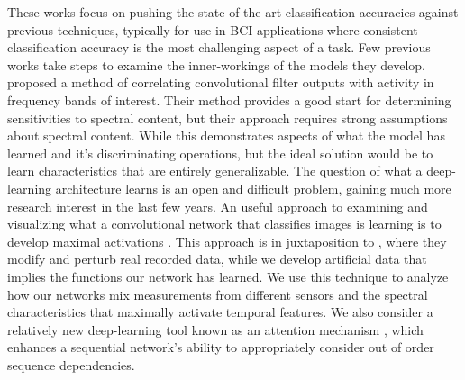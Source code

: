 \documentclass[utf8]{frontiersSCNS} %
\begin{document}
These works focus on pushing the state-of-the-art classification accuracies against previous techniques, typically for use in BCI applications where consistent classification accuracy is the most challenging aspect of a task. Few previous works take steps to examine the inner-workings of the models they develop. \cite{Schirrmeister2017} proposed a method of correlating convolutional filter outputs with activity in frequency bands of interest. Their method provides a good start for determining sensitivities to spectral content, but their approach requires strong assumptions about spectral content. While this demonstrates aspects of what the model has learned and it's discriminating operations, but the ideal solution would be to learn characteristics that are entirely generalizable. The question of what a deep-learning architecture learns is an open and difficult problem, gaining much more research interest in the last few years. An useful approach to examining and visualizing what a convolutional network that classifies images is learning is to develop maximal activations \cite{Yosinski2015}. This approach is in juxtaposition to \cite{Schirrmeister2017}, where they modify and perturb real recorded data, while we develop artificial data that implies the functions our network has learned. We use this technique to analyze how our networks mix measurements from different sensors and the spectral characteristics that maximally activate temporal features. We also consider a relatively new deep-learning tool known as an attention mechanism \cite{XuKELVINXU, Ye2017}, which enhances a sequential network's ability to appropriately consider out of order sequence dependencies.


\end{document}
